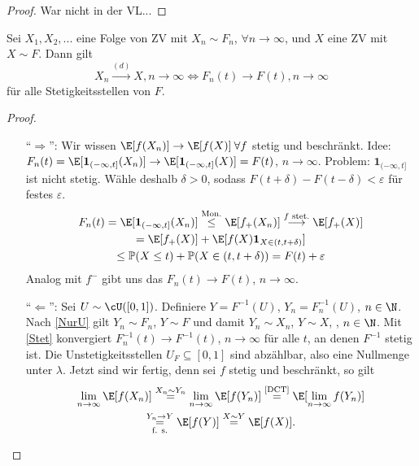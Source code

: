 \begin{proof}
	War nicht in der VL...
\end{proof}

\begin{satz}
	Sei $X_1,X_2,...$ eine Folge von ZV mit $X_n \sim F_n$, $\forall n \to \infty$, und $X$ eine ZV mit $X \sim F$. Dann gilt
	\[ X_n \overset{(d)}{\longrightarrow} X, n \to \infty \Leftrightarrow F_n(t) \to F(t), n \to \infty \]
	für alle Stetigkeitsstellen von $F$.
\end{satz}

\begin{proof}\abs
	\begin{itemize}
		\item[\enquote{$\Rightarrow$}:] Wir wissen $\E[f(X_n)] \to \E[f(X)] \: \forall f$ stetig und beschränkt. Idee: $F_n(t) = \E[\mathbf{1}_{(-\infty,t]}(X_n)] \to  \E[\mathbf{1}_{(-\infty,t]}(X)] = F(t)$, $n \to \infty$. Problem: $\mathbf{1}_{(-\infty,t]}$ ist nicht stetig.
		Wähle deshalb $\delta > 0$, sodass $F(t + \delta) - F(t - \delta) < \varepsilon$ für festes $\varepsilon$. 
		\begin{gather*}
			F_n(t) = \E[\mathbf{1}_{(-\infty, t]}(X_n)] \overset{\text{Mon.}}{\leq} \E[f_{+}(X_n)] \overset{\text{$f$ stet.}}{\longrightarrow} \E[f_{+}(X)] \\ 
			= \E[f_{+}(X)] + \E[f(X) \mathbf{1}_{X \in (t, t + \delta)}] \\
			\leq \mathbb{P}(X \leq t) + \mathbb{P}(X \in (t, t + \delta)) = F(t) + \varepsilon
		\end{gather*}
		Analog mit $f^{-}$ gibt uns das $F_n(t) \to F(t)$, $n \to \infty$.
		
		\item[\enquote{$\Leftarrow$}:] Sei $U \sim \cU([0,1])$. Definiere $Y = F^{-1}(U)$, $Y_n = F_n^{-1}(U)$, $n \in \N$. Nach \ref{NurU} gilt $Y_n \sim F_n$, $Y \sim F$ und damit $Y_n \sim X_n$, $Y \sim X$, , $n \in \N$. Mit \ref{Stet} konvergiert $F_n^{-1}(t) \to F^{-1}(t)$, $n \to \infty$ für alle $t$, an denen $F^{-1}$ stetig ist. Die Unstetigkeitsstellen $U_F \subseteq [0,1]$ sind abzählbar, also eine Nullmenge unter $\lambda$. Jetzt sind wir fertig, denn sei $f$ stetig und beschränkt, so gilt
		\begin{gather*}
			\lim\limits_{n\to\infty} \E[f(X_n)] \overset{X_n \sim Y_n}{=} \lim\limits_{n\to\infty} \E[f(Y_n)] \overset{\text{\ref{DCT}}}{=} \E[\lim\limits_{n\to\infty} f(Y_n)]\\
			\overset{Y_n \to Y}{\underset{\text{f. s.}}{=}} \E[f(Y)] \overset{X \sim Y}{=} \E[f(X)].\\
		\end{gather*}
	\end{itemize}
\end{proof}